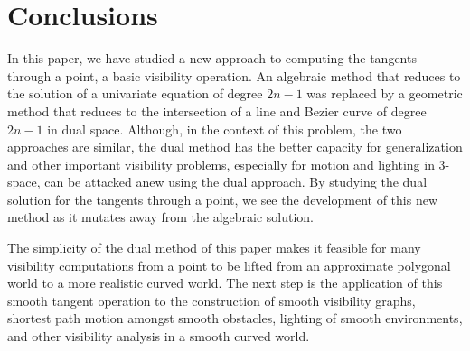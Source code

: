 \documentclass[twocolumn,10pt]{article}
\begin{document}
\section{Conclusions}
\label{sec:comparison}

In this paper, we have studied a new approach to computing the tangents
through a point, a basic visibility operation.
An algebraic method that reduces to the solution of a univariate equation of degree $2n-1$
was replaced by a geometric method that reduces to the intersection
of a line and Bezier curve of degree $2n-1$ in dual space.
Although, in the context of this problem, the two approaches are similar,
the dual method has the better capacity for generalization and
other important visibility problems, especially for motion and lighting in 
3-space, can be attacked anew using the dual approach.
By studying the dual solution for the tangents through a point,
we see the development of this new method as it mutates away from the
algebraic solution.

The simplicity of the dual method of this paper makes it feasible
for many visibility computations from a point to be lifted from an approximate
polygonal world to a more realistic curved world.
The next step is the application of this smooth tangent operation 
to the construction of smooth visibility graphs, shortest path motion
amongst smooth obstacles, lighting of smooth environments,
and other visibility analysis in a smooth curved world.
\end{document}

